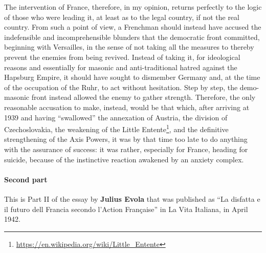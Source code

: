 The intervention of France, therefore, in my opinion, returns perfectly to the logic of those who were leading it, at least as to the legal country, if not the real country. From such a point of view, a Frenchman should instead have accused the indefensible and incomprehensible blunders that the democratic front committed, beginning with Versailles, in the sense of not taking all the measures to thereby prevent the enemies from being revived. Instead of taking it, for ideological reasons and essentially for masonic and anti-traditional hatred against the Hapsburg Empire, it should have sought to dismember Germany and, at the time of the occupation of the Ruhr, to act without hesitation. Step by step, the demo-masonic front instead allowed the enemy to gather strength. Therefore, the only reasonable accusation to make, instead, would be that which, after arriving at 1939 and having ``swallowed'' the annexation of Austria, the division of Czechoslovakia, the weakening of the Little Entente\footnote{\url{https://en.wikipedia.org/wiki/Little\_Entente}}, and the definitive strengthening of the Axis Powers, it was by that time too late to do anything with the assurance of success: it was rather, especially for France, heading for suicide, because of the instinctive reaction awakened by an anxiety complex.

\paragraph{Second part}

This is Part II of the essay by \textbf{Julius Evola} that was published as ``La disfatta e il futuro dell Francia secondo l'Action Française'' in La Vita Italiana, in April 1942.

